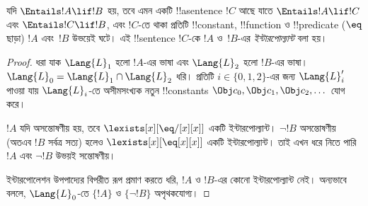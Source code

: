 \documentclass[../../../include/open-logic-section]{subfiles}
\begin{document}


\begin{thm}[ক্রেগের ইন্টারপোলেশন উপপাদ্য]
যদি $\Entails !A \lif !B$ হয়, তবে এমন একটি !!a{sentence} $!C$ আছে যাতে
$\Entails !A \lif !C$ এবং $\Entails !C \lif !B$, এবং $!C$-তে থাকা
প্রতিটি !!{constant}, !!{function} ও !!{predicate} ($\eq$ ছাড়া)
$!A$ এবং~$!B$ উভয়েই ঘটে। এই !!{sentence} $!C$-কে $!A$ ও~$!B$-এর
\emph{ইন্টারপোল্যান্ট} বলা হয়।
\end{thm}

\begin{proof}
ধরা যাক $\Lang{L}_1$ হলো $!A$-এর ভাষা এবং $\Lang{L}_2$ হলো
$!B$-এর ভাষা। $\Lang{L}_0 = \Lang{L}_1 \cap \Lang{L}_2$ ধরি।
প্রতিটি $i \in \{0, 1, 2 \}$-এর জন্য $\Lang{L}'_i$ পাওয়া যায়
$\Lang{L}_i$-তে অসীমসংখ্যক নতুন !!{constant}s
$\Obj c_0, \Obj c_1, \Obj c_2, \dots$ যোগ করে।

$!A$ যদি অসন্তোষণীয় হয়, তবে
$\lexists[x][\eq/[x][x]]$ একটি ইন্টারপোল্যান্ট। $\lnot !B$
অসন্তোষণীয় (অতএব $!B$ সর্বত্র সত্য) হলেও
$\lexists[x][\eq[x][x]]$ একটি ইন্টারপোল্যান্ট। তাই এখন ধরে নিতে পারি
$!A$ এবং $\lnot !B$ উভয়ই সন্তোষণীয়।

ইন্টারপোলেশন উপপাদ্যের বিপরীত রূপ প্রমাণ করতে ধরি, $!A$ ও $!B$-এর
কোনো ইন্টারপোল্যান্ট নেই। অন্যভাবে বললে,
$\Lang{L}_0$-তে $\{!A\}$ ও $\{\lnot !B\}$ অপৃথকযোগ্য।


\end{proof}
\end{document}

